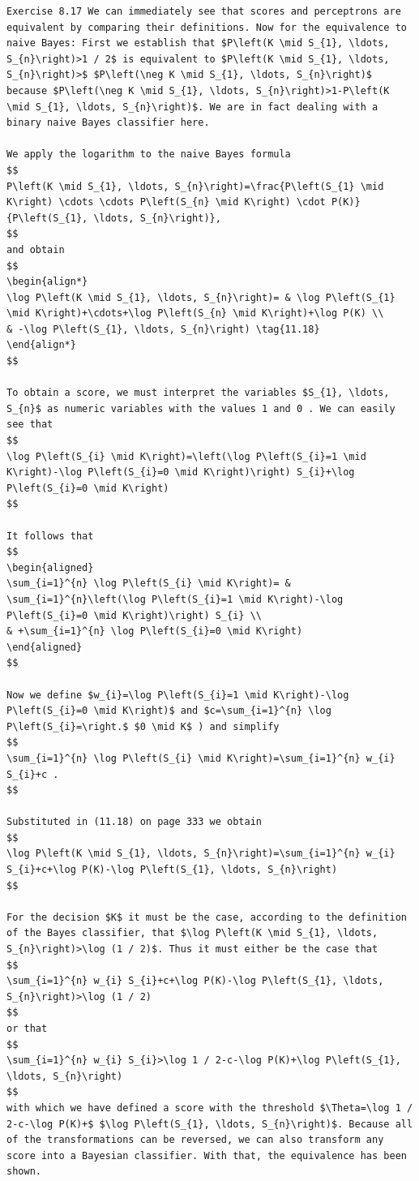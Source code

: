 \documentclass[10pt]{book}
\begin{document}
\begin{verbatim}
Exercise 8.17 We can immediately see that scores and perceptrons are equivalent by comparing their definitions. Now for the equivalence to naive Bayes: First we establish that $P\left(K \mid S_{1}, \ldots, S_{n}\right)>1 / 2$ is equivalent to $P\left(K \mid S_{1}, \ldots, S_{n}\right)>$ $P\left(\neg K \mid S_{1}, \ldots, S_{n}\right)$ because $P\left(\neg K \mid S_{1}, \ldots, S_{n}\right)>1-P\left(K \mid S_{1}, \ldots, S_{n}\right)$. We are in fact dealing with a binary naive Bayes classifier here.

We apply the logarithm to the naive Bayes formula
$$
P\left(K \mid S_{1}, \ldots, S_{n}\right)=\frac{P\left(S_{1} \mid K\right) \cdots \cdots P\left(S_{n} \mid K\right) \cdot P(K)}{P\left(S_{1}, \ldots, S_{n}\right)},
$$
and obtain
$$
\begin{align*}
\log P\left(K \mid S_{1}, \ldots, S_{n}\right)= & \log P\left(S_{1} \mid K\right)+\cdots+\log P\left(S_{n} \mid K\right)+\log P(K) \\
& -\log P\left(S_{1}, \ldots, S_{n}\right) \tag{11.18}
\end{align*}
$$

To obtain a score, we must interpret the variables $S_{1}, \ldots, S_{n}$ as numeric variables with the values 1 and 0 . We can easily see that
$$
\log P\left(S_{i} \mid K\right)=\left(\log P\left(S_{i}=1 \mid K\right)-\log P\left(S_{i}=0 \mid K\right)\right) S_{i}+\log P\left(S_{i}=0 \mid K\right)
$$

It follows that
$$
\begin{aligned}
\sum_{i=1}^{n} \log P\left(S_{i} \mid K\right)= & \sum_{i=1}^{n}\left(\log P\left(S_{i}=1 \mid K\right)-\log P\left(S_{i}=0 \mid K\right)\right) S_{i} \\
& +\sum_{i=1}^{n} \log P\left(S_{i}=0 \mid K\right)
\end{aligned}
$$

Now we define $w_{i}=\log P\left(S_{i}=1 \mid K\right)-\log P\left(S_{i}=0 \mid K\right)$ and $c=\sum_{i=1}^{n} \log P\left(S_{i}=\right.$ $0 \mid K$ ) and simplify
$$
\sum_{i=1}^{n} \log P\left(S_{i} \mid K\right)=\sum_{i=1}^{n} w_{i} S_{i}+c .
$$

Substituted in (11.18) on page 333 we obtain
$$
\log P\left(K \mid S_{1}, \ldots, S_{n}\right)=\sum_{i=1}^{n} w_{i} S_{i}+c+\log P(K)-\log P\left(S_{1}, \ldots, S_{n}\right)
$$

For the decision $K$ it must be the case, according to the definition of the Bayes classifier, that $\log P\left(K \mid S_{1}, \ldots, S_{n}\right)>\log (1 / 2)$. Thus it must either be the case that
$$
\sum_{i=1}^{n} w_{i} S_{i}+c+\log P(K)-\log P\left(S_{1}, \ldots, S_{n}\right)>\log (1 / 2)
$$
or that
$$
\sum_{i=1}^{n} w_{i} S_{i}>\log 1 / 2-c-\log P(K)+\log P\left(S_{1}, \ldots, S_{n}\right)
$$
with which we have defined a score with the threshold $\Theta=\log 1 / 2-c-\log P(K)+$ $\log P\left(S_{1}, \ldots, S_{n}\right)$. Because all of the transformations can be reversed, we can also transform any score into a Bayesian classifier. With that, the equivalence has been shown.


\end{verbatim}
\end{document}
